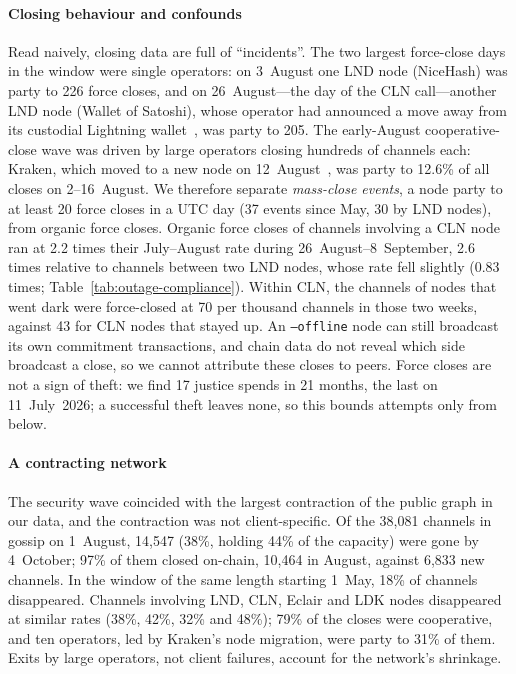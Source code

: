 \documentclass[conference]{IEEEtran}
\begin{document}
\paragraph*{Closing behaviour and confounds}
Read naively, closing data are full of ``incidents''. The two largest force-close days in the window were
single operators: on 3~August one LND node (NiceHash) was party to 226 force closes, and on 26~August---the day
of the CLN call---another LND node (Wallet of Satoshi), whose operator had announced a move away from its custodial
Lightning wallet~\cite{bitcoinworld2026wos}, was party to 205. The early-August cooperative-close wave was driven by
large operators closing hundreds of channels each: Kraken, which moved to a new node on
12~August~\cite{kraken2026node}, was party to 12.6\% of all closes on 2--16~August. We therefore separate
\emph{mass-close events}, a node party to at least 20 force closes in a UTC day (37 events since May, 30 by LND
nodes), from organic force closes. Organic force closes of channels involving a CLN node ran at 2.2 times their
July--August rate during 26~August--8~September, 2.6 times relative to channels between two LND nodes, whose rate
fell slightly (0.83 times; Table~\ref{tab:outage-compliance}). Within CLN, the channels of nodes that went dark were
force-closed at 70 per thousand channels in those two weeks, against 43 for CLN nodes that stayed up.
An \texttt{--offline} node can still broadcast its own commitment transactions, and chain data do not reveal which
side broadcast a close, so we cannot attribute these closes to peers. Force closes are not a sign of theft: we find
17 justice spends in 21 months, the last on 11~July~2026; a successful theft leaves none, so this bounds attempts
only from below.

\paragraph*{A contracting network}
The security wave coincided with the largest contraction of the public graph in our data, and the contraction was
not client-specific. Of the 38,081 channels in gossip on 1~August, 14,547 (38\%, holding 44\% of the capacity) were
gone by 4~October; 97\% of them closed on-chain, 10,464 in August, against 6,833 new channels. In the window of the
same length starting 1~May, 18\% of channels disappeared. Channels involving LND, CLN, Eclair and LDK nodes
disappeared at similar rates (38\%, 42\%, 32\% and 48\%); 79\% of the closes were cooperative, and ten operators,
led by Kraken's node migration, were party to 31\% of them. Exits by large operators, not client failures, account
for the network's shrinkage.
\end{document}

